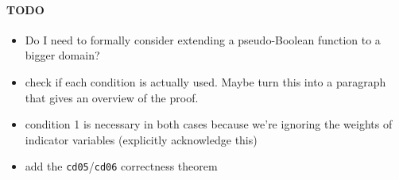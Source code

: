 \documentclass[runningheads]{llncs}
\begin{document}
\paragraph{TODO}
\begin{itemize}
\item Do I need to formally consider extending a pseudo-Boolean function to a
  bigger domain?
\item check if each condition is actually used. Maybe turn this into a paragraph
  that gives an overview of the proof.
\item condition 1 is necessary in both cases because we're ignoring the weights
  of indicator variables (explicitly acknowledge this)
\item add the \texttt{cd05}/\texttt{cd06} correctness theorem
\end{itemize}



\end{document}

